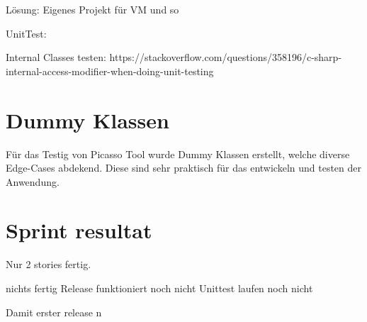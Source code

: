 Lösung:
Eigenes Projekt für VM und so




UnitTest:

Internal Classes testen:
https://stackoverflow.com/questions/358196/c-sharp-internal-access-modifier-when-doing-unit-testing

\section{Dummy Klassen}
Für das Testig von Picasso Tool wurde Dummy Klassen erstellt, welche diverse Edge-Cases abdekend.
Diese sind sehr praktisch für das entwickeln und testen der Anwendung.


\section{Sprint resultat}
Nur 2 stories fertig.


nichts fertig
Release funktioniert noch nicht
Unittest laufen noch nicht

Damit erster release n

